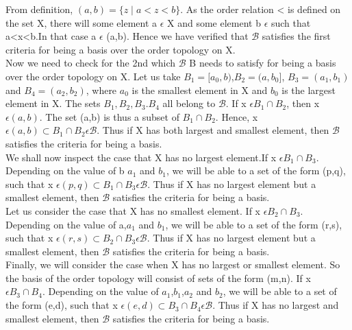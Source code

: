 \documentclass[a4paper,english,12pt]{article}
\begin{document}
\begin{flushleft}
\vspace{1mm}
From definition, $(a,b)=\{z\mid a<z<b\}$. As the order relation < is defined on the set X, there will some element a $\epsilon$ X and some element b $\epsilon$ such that a<x<b.In that case a $\epsilon$ (a,b). Hence we have verified that $\mathscr{B}$ satisfies the first criteria for being a basis over the order topology on X.\\
Now we need to check for the 2nd  which $\mathscr{B}$ B needs to satisfy for being a basis over the order topology on X. Let us take $B_1=[a_0,b)$,$B_2=(a,b_0]$, $B_3=(a_1,b_1)$ and $B_4=(a_2,b_2)$, where $a_0$ is the smallest element in X and $b_0$ is the largest element in X. The sets $B_1,B_2,B_3.B_4$ all belong to $\mathscr{B}$.
If x $\epsilon B_1 \cap B_2$, then x $\epsilon (a,b)$. The set (a,b) is thus a subset of $B_1 \cap B_2$. Hence, x $\epsilon (a,b) \subset B_1 \cap B_2 \epsilon \mathscr{B}$. Thus if X has both largest and smallest element, then $\mathscr{B}$ satisfies the criteria for being a basis.\\
\vspace{1mm}
We shall now inspect the case that X has no largest element.If x $\epsilon B_1 \cap B_3$. Depending on the value of b  $a_1$ and $b_1$, we will be able to a set of the form (p,q), such that  x $\epsilon (p,q) \subset B_1 \cap B_3 \epsilon \mathscr{B}$. Thus if X has no largest element but a smallest element, then $\mathscr{B}$ satisfies the criteria for being a basis.\\
\vspace{1mm}
Let us consider the case that X has no smallest element. If x $\epsilon B_2 \cap B_3$. Depending on the value of a,$a_1$ and $b_1$, we will be able to a set of the form (r,s), such that  x $\epsilon (r,s) \subset B_2 \cap B_3 \epsilon \mathscr{B}$. Thus if X has no largest element but a smallest element, then $\mathscr{B}$ satisfies the criteria for being a basis.\\
\vspace{1mm}
Finally, we will consider the case when X has no largest or smallest element. So the basis of the order topology will consist of sets of the form (m,n). If x $\epsilon B_3 \cap B_4$. Depending on the value of $a_1$,$b_1$,$a_2$ and $b_2$, we will be able to a set of the form (e,d), such that  x $\epsilon (e,d) \subset B_3 \cap B_4 \epsilon \mathscr{B}$. Thus if X has no largest and smallest element, then $\mathscr{B}$ satisfies the criteria for being a basis.\\
\vspace{1mm}

\end{flushleft}
\end{document}
